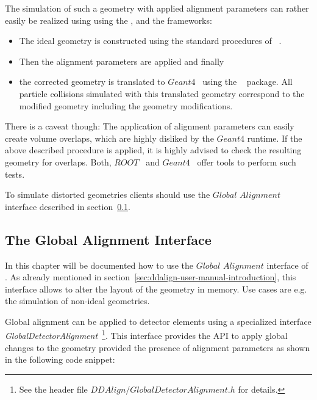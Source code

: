 \documentclass[10pt,a4paper]{article}
\begin{document}
\noindent
The simulation of such a geometry with applied alignment parameters can 
rather easily be realized using using the \DDhep, \DDA and the \DDG frameworks:
\begin{itemize}\itemcompact
\item The ideal geometry is constructed using the standard procedures
    of \DDhep~\cite{bib:DD4hep}.
\item Then the alignment parameters are applied and finally
\item the corrected geometry is translated to $Geant4$~\cite{bib:geant4}
    using the \DDG~\cite{bib:DDG4} package.
    All particle collisions simulated with this translated geometry 
    correspond to the modified geometry including the geometry
    modifications.
\end{itemize}
There is a caveat though: The application of alignment parameters can
easily create volume overlaps, which are highly disliked by the $Geant4$ 
runtime. If the above described procedure is applied, it is highly advised 
to check the resulting geometry for overlaps. Both, 
$ROOT$~\cite{bib:ROOT-tgeo} and $Geant4$~\cite{bib:geant4} offer tools 
to perform such tests.

\noindent
To simulate distorted geometries clients should use the 
$Global$ $Alignment$  interface described in 
section~\ref{sec:ddalign-user-manual-ddalign-global-interface}.

\newpage
\subsection{The Global Alignment Interface}
\label{sec:ddalign-user-manual-ddalign-global-interface}

\noindent
In this chapter will be documented how to use the $Global$ $Alignment$ 
interface of \DDA. As already mentioned in 
section~\ref{sec:ddalign-user-manual-introduction}, 
this interface allows to alter the layout of the 
geometry in memory. Use cases are e.g. the simulation of 
non-ideal geometries.

\noindent
Global alignment can be applied to detector elements using a specialized
interface {\it{GlobalDetectorAlignment}}~\footnote{See the header file
$DDAlign/GlobalDetectorAlignment.h$ for details.}. This interface 
provides the API to apply global changes to the geometry provided
the presence of alignment parameters as shown in the following 
code snippet:
\end{document}
